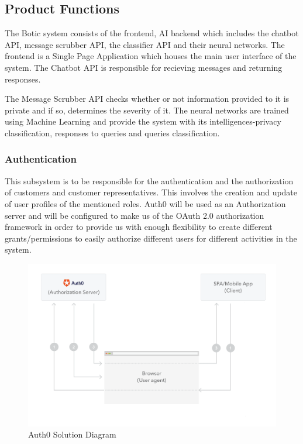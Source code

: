 \documentclass[11pt]{article}
\begin{document}
\subsection{Product Functions}%

The Botic system consists of the frontend, AI backend which includes the chatbot API, message scrubber API, the classifier API and their neural networks. The frontend is a Single Page Application which houses the main user interface of the system. The Chatbot API is responsible for recieving messages and returning responses.\par

The Message Scrubber API checks whether or not information provided to it is private and if so, determines the severity of it. The neural networks are trained using Machine Learning and provide the system with its intelligences-privacy classification, responses to queries and queries classification.

\subsubsection{Authentication}

This subsystem is to be responsible for the authentication and the authorization of customers and customer representatives. This involves the creation and update of user profiles of the mentioned roles. Auth0 will be used as an Authorization server and will be configured to make us of the OAuth 2.0 authorization framework in order to provide us with enough flexibility to create different grants/permissions to easily authorize different users for different activities in the system.

\begin{figure}[H]
	\centering
	\includegraphics[width=1.0\textwidth]{../../images/implicit-grant.png}
	\caption{Auth0 Solution Diagram\cite{Website:1}}
\end{figure}
\end{document}
